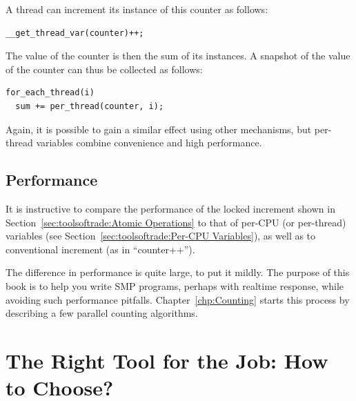 A thread can increment its instance of this counter as follows:

\vspace{5pt}
\begin{minipage}[t]{\columnwidth}
\small
\begin{verbatim}
__get_thread_var(counter)++;
\end{verbatim}
\end{minipage}
\vspace{5pt}

The value of the counter is then the sum of its instances.
A snapshot of the value of the counter can thus be collected
as follows:

\vspace{5pt}
\begin{minipage}[t]{\columnwidth}
\small
\begin{verbatim}
for_each_thread(i)
  sum += per_thread(counter, i);
\end{verbatim}
\end{minipage}
\vspace{5pt}

Again, it is possible to gain a similar effect using other mechanisms,
but per-thread variables combine convenience and high performance.

\subsection{Performance}
\label{sec:toolsoftrade:Performance}

It is instructive to compare the performance of the locked increment
shown in
Section~\ref{sec:toolsoftrade:Atomic Operations}
to that of per-CPU (or per-thread) variables
(see Section~\ref{sec:toolsoftrade:Per-CPU Variables}),
as well as to conventional increment (as in ``counter++'').




The difference in performance is quite large, to put it mildly.
The purpose of this book is to help you write SMP programs,
perhaps with realtime response, while avoiding such performance
pitfalls.
Chapter~\ref{chp:Counting}
starts this process by describing a few parallel counting algorithms.

\section{The Right Tool for the Job: How to Choose?}
\label{sec:toolsoftrade:The Right Tool for the Job: How to Choose?}

